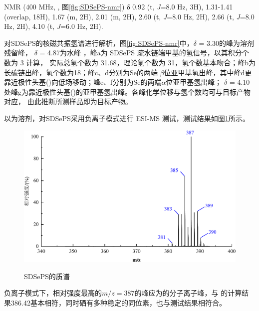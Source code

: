 \documentclass[bachelor,fandolfonts,replaceperiod]{jnuthesis}
\begin{document}
     NMR (400 MHz, , 图\ref{fig:SDSePS-nmr}) δ 0.92 (t, \textit{J}=8.0 Hz, 3H), 1.31-1.41 (overlap, 18H), 
    1.67 (m, 2H), 2.01 (m, 2H), 2.60 (t, \textit{J}=8.0 Hz, 2H), 2.66 (t, \textit{J}=8.0 Hz, 2H),  4.10 (t, \textit{J}=6.0 Hz, 2H).
    
    对SDSePS的核磁共振氢谱进行解析，图\ref{fig:SDSePS-nmr}中，$\delta$ = 3.30的峰为溶剂残留峰，
    $\delta$ = 4.87为水峰\cite{波谱解析} ，峰a为 SDSePS 疏水链端甲基的氢信号，以其积分个数为 3 计算，
    实际总氢个数为 31.68，理论氢个数为 31，氢个数基本吻合；峰b为长碳链出峰，氢个数为18；峰c、d分别为Se的两端
    $\beta$位亚甲基氢出峰，其中峰d更靠近极性头基()向低场移动；峰e、f分别为Se的两端$\alpha$位亚甲基氢出峰；
    $\delta$ = 4.10处峰g为靠近极性头基()的亚甲基氢出峰。各峰化学位移与氢个数均可与目标产物对应，
    由此推断所测样品即为目标产物。
    
    以为溶剂，对SDSePS采用负离子模式进行 ESI-MS 测试，测试结果如图\ref{fig:SDSePS-mass}所示。
     \begin{figure}[htbp]
        \centering
        \includegraphics[width=.8\textwidth]{figure/SDSePS-mass.pdf}\\
        \caption{SDSePS的质谱}\label{fig:SDSePS-mass}
    \end{figure}
    
    负离子模式下，相对强度最高的$m/z = 387$的峰应为的分子离子峰，与
    的计算结果386.42基本相符，同时硒有多种稳定的同位素，也与测试结果相符合。
    
\end{document}
